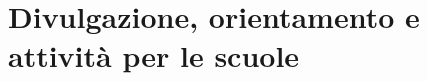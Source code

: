 \documentclass[10pt,a4paper,sans,colorlinks]{moderncv}
\let\oldsection\section
\renewcommand{\section}{\needspace{8\baselineskip}\oldsection}
\newlength{\cvavail}
\newcommand{\yrule}{\specialrule{0.3pt}{1.5pt}{1.5pt}}
\newenvironment{cvtable}[4]{%
  \small
  \setlength{\tabcolsep}{5pt}%
  \setlength{\cvavail}{\dimexpr\linewidth-2\tabcolsep*#1\relax}%
  \renewcommand{\arraystretch}{1.1}%
  \begin{longtable}{#2}%
    \ifx\\#3\\\else\multicolumn{#1}{c}{\large\textbf{#3}}\\ \addlinespace[3pt]\toprule\fi
    #4 \\ \midrule \endfirsthead
    #4 \\ \midrule \endhead
    \bottomrule \endfoot
    \endlastfoot
}{\end{longtable}}
\begin{document}


\section{Divulgazione, orientamento e attività per le scuole}
\end{document}

